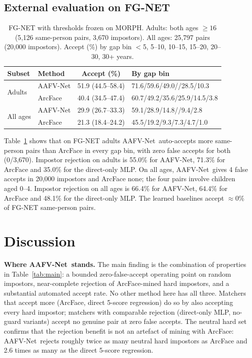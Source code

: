 \documentclass[10pt, a4paper, twocolumn]{article}
\newcommand{\sys}{AAFV-Net}
\begin{document}
\subsection{External evaluation on FG-NET}
\begin{table}[t]
\centering\small
\caption{FG-NET with thresholds frozen on MORPH. Adults: both ages $\ge16$ (5{,}126 same-person pairs, 3{,}670 impostors). All ages: 25{,}797 pairs (20{,}000 impostors). Accept (\%) by gap bin $<$5, 5--10, 10--15, 15--20, 20--30, 30+ years.}
\label{tab:fg}
\setlength{\tabcolsep}{2pt}\small
\begin{tabular}{@{}llcl@{}}
\toprule
Subset & Method & Accept (\%) & By gap bin\\\midrule
\multirow{2}{*}{Adults} & \sys & 51.9 (44.5--58.4) & 71.6/59.6/49.0/\allowbreak38.2/28.5/10.3\\
 & ArcFace & 40.4 (34.5--47.4) & 60.7/49.2/35.6/25.9/14.5/3.8\\\midrule
\multirow{2}{*}{All ages} & \sys & 29.9 (26.7--33.3) & 59.1/28.9/14.8/\allowbreak11.7/9.4/2.8\\
 & ArcFace & 21.3 (18.4--24.2) & 45.5/19.2/9.3/7.3/4.7/1.0\\\bottomrule
\end{tabular}
\end{table}
Table~\ref{tab:fg} shows that on FG-NET adults \sys\ auto-accepts more same-person pairs than ArcFace in every gap bin, with zero false accepts for both (0/3{,}670). Impostor rejection on adults is 55.0\% for \sys, 71.3\% for ArcFace and 35.0\% for the direct-only MLP. On all ages, \sys\ gives 4 false accepts in 20{,}000 impostors and ArcFace none; the four pairs involve children aged 0--4. Impostor rejection on all ages is 66.4\% for \sys, 64.4\% for ArcFace and 48.1\% for the direct-only MLP. The learned baselines accept $\approx$0\% of FG-NET same-person pairs.

\section{Discussion}
\textbf{Where \sys\ stands.} The main finding is the combination of properties in Table~\ref{tab:main}: a bounded zero-false-accept operating point on random impostors, near-complete rejection of ArcFace-mined hard impostors, and a substantial automated accept rate. No other method here has all three. Matchers that accept more (ArcFace, direct 5-score regression) do so by also accepting every hard impostor; matchers with comparable rejection (direct-only MLP, no-guard variants) accept no genuine pair at zero false accepts. The neutral hard set confirms that the rejection benefit is not an artefact of mining with ArcFace: \sys\ rejects roughly twice as many neutral hard impostors as ArcFace and 2.6 times as many as the direct 5-score regression.
\end{document}
